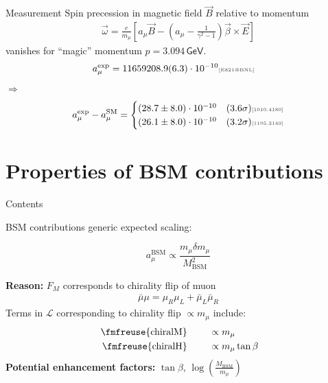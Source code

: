 \documentclass[hyperref={pdfpagelabels=false},ngerman]{beamer}
\newcommand{\fmfvcenter}[1]{\;\vcenter{\hbox{\fmfreuse{#1}}}\;}
\newcommand{\eh}[1]{\,\mathsf{#1}}
\newcommand{\mycite}[1]{\textcolor{darkgray}{\tiny [#1]}}
\renewcommand{\emph}{\textbf}
\newcommand{\SM}{\ensuremath{\text{SM}}}
\newcommand{\amu}{a_\mu}
\newcommand{\amuexp}{\amu^{\text{exp}}}
\newcommand{\amuSM}{\amu^{\SM}}
\begin{document}
\begin{frame}{Measurement}
  Spin precession in magnetic field $\vec{B}$ relative to momentum
  \begin{align*}
    \vec{\omega} = \frac{e}{m_\mu} \left[\amu\vec{B}
      - \left(\amu - \frac{1}{\gamma^2 - 1}\right)
      \vec{\beta}\times\vec{E} \right]
  \end{align*}
  vanishes for ``magic'' momentum $p=3.094\eh{GeV}$.
  \begin{align*}
    \amuexp &= 11659208.9(6.3)\cdot 10^{-10} \text{\mycite{E821@BNL}}
  \end{align*}
  $\Rightarrow$
  \begin{align*}
    \amuexp - \amuSM =
    \begin{cases}
      (28.7 \pm 8.0)\cdot 10^{-10} &(3.6\sigma) \text{\mycite{1010.4180}} \\
      (26.1 \pm 8.0)\cdot 10^{-10} &(3.2\sigma) \text{\mycite{1105.3149}}
    \end{cases}
  \end{align*}
\end{frame}

\section{Properties of BSM contributions}

\begin{frame}{Contents}
  \tableofcontents[currentsection]
\end{frame}

\begin{frame}{BSM contributions}
  generic expected scaling:\\
  \begin{centering}
    \begin{tcolorbox}[width=0.6\textwidth,colframe={red},colback={white}]
      \begin{equation*}
        a_\mu^\text{BSM} \propto \frac{m_\mu \delta m_\mu}{M_\text{BSM}^2}
      \end{equation*}
    \end{tcolorbox}
  \end{centering}
  \emph{Reason:} $F_M$ corresponds to chirality flip of muon
  \begin{align*}
    \bar{\mu}\mu = \mu_R \mu_L + \bar{\mu}_L \bar{\mu}_R
  \end{align*}
  Terms in $\mathcal{L}$ corresponding to chirality flip $\propto m_\mu$ include:
  \begin{align*}
    \fmfvcenter{chiralM} &\qquad\propto m_\mu \\
    \fmfvcenter{chiralH} &\qquad\propto m_\mu \tan\beta
  \end{align*}
  \emph{Potential enhancement factors:}
  $\tan\beta$, $\log\left(\frac{M_\text{BSM}}{m_\mu}\right)$
\end{frame}
\end{document}
